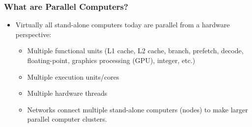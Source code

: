 \documentclass[10pt,t]{beamer}
\begin{document}
\begin{frame}
  \frametitle{What are Parallel Computers?}
  \begin{itemize}
  \item Virtually all stand-alone computers today are parallel from a hardware perspective:
    \begin{itemize}
    \item Multiple functional units (L1 cache, L2 cache, branch, prefetch, decode, floating-point, graphics processing (GPU), integer, etc.)
    \item Multiple execution units/cores
    \item Multiple hardware threads
    \item Networks connect multiple stand-alone computers (nodes) to make larger parallel computer clusters.
    \end{itemize}
  \end{itemize}
\end{frame}
\end{document}

